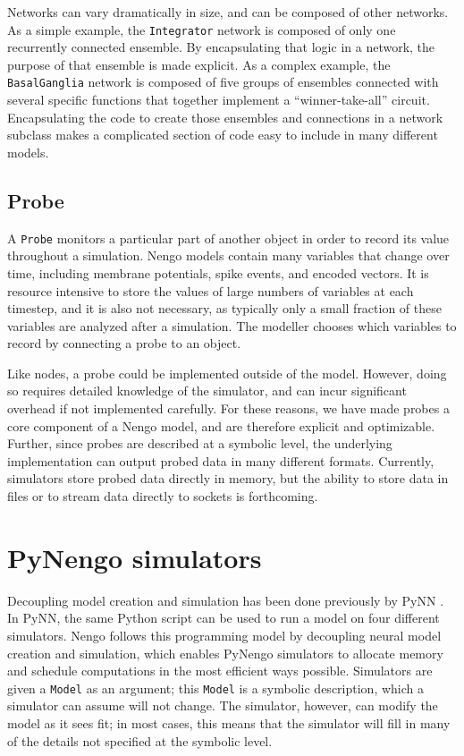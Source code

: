 \documentclass{frontiersSCNS}
\begin{document}
Networks can vary dramatically in size,
and can be composed of other networks.
As a simple example, the \texttt{Integrator} network
is composed of only one recurrently connected ensemble.
By encapsulating that logic in a network,
the purpose of that ensemble is made explicit.
As a complex example,
the \texttt{BasalGanglia} network
is composed of five groups of ensembles
connected with several specific functions
that together implement a ``winner-take-all'' circuit.
Encapsulating the code to create those ensembles
and connections in a network subclass
makes a complicated section of code
easy to include in many different models.

\subsection{Probe}

A \texttt{Probe} monitors
a particular part of another object
in order to record its value throughout a simulation.
Nengo models contain many variables
that change over time,
including membrane potentials,
spike events, and encoded vectors.
It is resource intensive to store the values of
large numbers of variables
at each timestep, and it is also not necessary,
as typically only a small fraction
of these variables are analyzed after a simulation.
The modeller chooses which variables to
record by connecting a probe to an object.

Like nodes, a probe could be implemented
outside of the model.
However, doing so requires detailed knowledge
of the simulator,
and can incur significant overhead
if not implemented carefully.
For these reasons, we have made probes
a core component of a Nengo model,
and are therefore explicit
and optimizable.
Further, since probes are described
at a symbolic level,
the underlying implementation
can output probed data in many different formats.
Currently, simulators store probed data
directly in memory,
but the ability to store data
in files or to stream data
directly to sockets is forthcoming.


\section{PyNengo simulators} \label{sec:simulators}

Decoupling model creation and simulation
has been done previously
by PyNN \citep{davison2008}.
In PyNN, the same Python script
can be used to run a model
on four different simulators.
Nengo follows this programming model by
decoupling neural model creation and simulation,
which enables PyNengo simulators
to allocate memory and schedule computations
in the most efficient ways possible.
Simulators are given a \texttt{Model}
as an argument;
this \texttt{Model} is a symbolic description,
which a simulator can assume will not change.
The simulator, however,
can modify the model as it sees fit;
in most cases, this means that the simulator
will fill in many of the details
not specified at the symbolic level.
\end{document}
